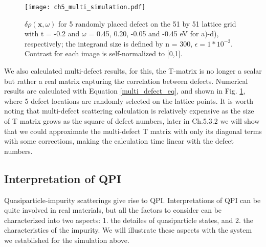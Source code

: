 \begin{figure}
	\centering
	\texttt{[image: ch5\_multi\_simulation.pdf]} 
	\caption{$\delta\rho(\textbf{x},\omega)$ for 5 randomly placed defect on the 51 by 51 lattice grid with t = -0.2 and $\omega$ = 0.45, 0.20, -0.05 and -0.45 eV for a)-d), respectively; the integrand size is defined by n = 300, $\epsilon = 1*10^{-3}$. Contrast for each image is self-normalized to [0,1].}
	\label{fig:ch5_multi_scattering}
\end{figure}

We also calculated multi-defect results, for this, the T-matrix is no longer a scalar but rather a real matrix capturing the correlation between defects. Numerical results are calculated with Equation \ref{multi_defect_eq}, and shown in Fig. \ref{fig:ch5_multi_scattering}, where 5 defect locations are randomly selected on the lattice points. It is worth noting that multi-defect scattering calculation is relatively expensive as the size of T matrix grows as the square of defect numbers, later in Ch.5.3.2 we will show that we could approximate the multi-defect T matrix with only its diagonal terms with some corrections, making the calculation time linear with the defect numbers.  


\subsection{Interpretation of QPI}
Quasiparticle-impurity scatterings give rise to \ac{QPI}. Interpretations of \ac{QPI} can be quite involved in real materials, but all the factors to consider can be characterized into two aspects: 1. the detailes of quasiparticle states, and 2. the characteristics of the impurity. We will illustrate these aspects with the system we established for the simulation above. 

